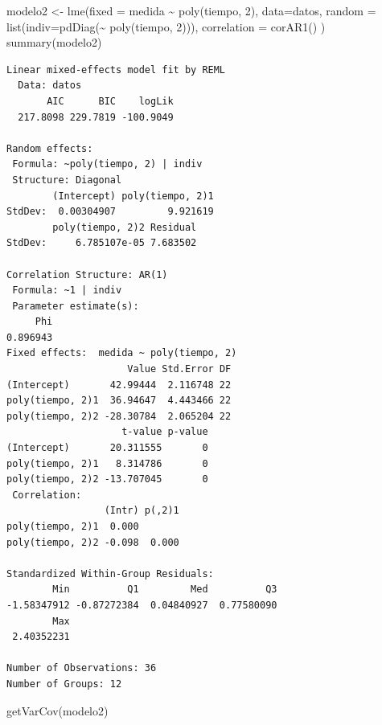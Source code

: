 \documentclass[
]{book}
\newenvironment{Shaded}{\begin{snugshade}}{\end{snugshade}}
\newcommand{\AttributeTok}[1]{\textcolor[rgb]{0.77,0.63,0.00}{#1}}
\newcommand{\DecValTok}[1]{\textcolor[rgb]{0.00,0.00,0.81}{#1}}
\newcommand{\FunctionTok}[1]{\textcolor[rgb]{0.00,0.00,0.00}{#1}}
\newcommand{\NormalTok}[1]{#1}
\newcommand{\OtherTok}[1]{\textcolor[rgb]{0.56,0.35,0.01}{#1}}
\newcommand{\SpecialCharTok}[1]{\textcolor[rgb]{0.00,0.00,0.00}{#1}}
\begin{document}
\begin{Shaded}
\begin{Highlighting}[]
\NormalTok{modelo2 }\OtherTok{\textless{}{-}} \FunctionTok{lme}\NormalTok{(}\AttributeTok{fixed =}\NormalTok{ medida }\SpecialCharTok{\textasciitilde{}} \FunctionTok{poly}\NormalTok{(tiempo, }\DecValTok{2}\NormalTok{), }
              \AttributeTok{data=}\NormalTok{datos,}
              \AttributeTok{random =} \FunctionTok{list}\NormalTok{(}\AttributeTok{indiv=}\FunctionTok{pdDiag}\NormalTok{(}\SpecialCharTok{\textasciitilde{}} \FunctionTok{poly}\NormalTok{(tiempo, }\DecValTok{2}\NormalTok{))),}
              \AttributeTok{correlation =} \FunctionTok{corAR1}\NormalTok{()}
\NormalTok{              )}
\FunctionTok{summary}\NormalTok{(modelo2)}
\end{Highlighting}
\end{Shaded}

\begin{verbatim}
Linear mixed-effects model fit by REML
  Data: datos 
       AIC      BIC    logLik
  217.8098 229.7819 -100.9049

Random effects:
 Formula: ~poly(tiempo, 2) | indiv
 Structure: Diagonal
        (Intercept) poly(tiempo, 2)1
StdDev:  0.00304907         9.921619
        poly(tiempo, 2)2 Residual
StdDev:     6.785107e-05 7.683502

Correlation Structure: AR(1)
 Formula: ~1 | indiv 
 Parameter estimate(s):
     Phi 
0.896943 
Fixed effects:  medida ~ poly(tiempo, 2) 
                     Value Std.Error DF
(Intercept)       42.99444  2.116748 22
poly(tiempo, 2)1  36.94647  4.443466 22
poly(tiempo, 2)2 -28.30784  2.065204 22
                    t-value p-value
(Intercept)       20.311555       0
poly(tiempo, 2)1   8.314786       0
poly(tiempo, 2)2 -13.707045       0
 Correlation: 
                 (Intr) p(,2)1
poly(tiempo, 2)1  0.000       
poly(tiempo, 2)2 -0.098  0.000

Standardized Within-Group Residuals:
        Min          Q1         Med          Q3 
-1.58347912 -0.87272384  0.04840927  0.77580090 
        Max 
 2.40352231 

Number of Observations: 36
Number of Groups: 12 
\end{verbatim}

\begin{Shaded}
\begin{Highlighting}[]
\FunctionTok{getVarCov}\NormalTok{(modelo2)}
\end{Highlighting}
\end{Shaded}
\end{document}
